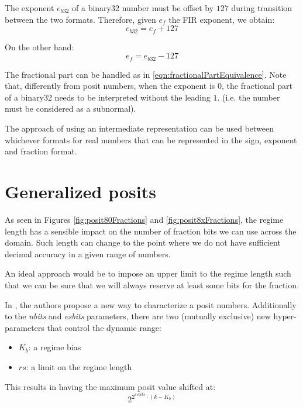 The exponent $e_{b32}$ of a binary32 number must be offset by $127$ during transition between the two formats. Therefore, given $e_f$ the FIR exponent, we obtain:
\begin{equation}
    e_{b32} = e_f + 127
\end{equation}

On the other hand:
\begin{equation}
    e_{f} = e_{b32} - 127
\end{equation}

The fractional part can be handled as in \ref{eqn:fractionalPartEquivalence}. Note that, differently from posit numbers, when the exponent is $0$, the fractional part of a binary32 needs to be interpreted without the leading $1.$ (i.e. the number must be considered as a subnormal).

The approach of using an intermediate representation can be used between whichever formats for real numbers that can be represented in the sign, exponent and fraction format.


\section{Generalized posits}

As seen in Figures \ref{fig:posit80Fractions} and \ref{fig:posit8xFractions}, the regime length has a sensible impact on the number of fraction bits we can use across the domain. Such length can change to the point where we do not have sufficient decimal accuracy in a given range of numbers. 

An ideal approach would be to impose an upper limit to the regime length such that we can be sure that we will always reserve at least some bits for the fraction.

In \cite{9151086}, the authors propose a new way to characterize a posit numbers. Additionally to the \textit{nbits}  and \textit{esbits} parameters, there are two (mutually exclusive) new hyper-parameters that control the dynamic range:
\begin{itemize}
    \item $K_b$: a regime bias 
    \item $rs$: a limit on the regime length
\end{itemize}

This results in having the maximum posit value shifted at:
\begin{equation}
    2^{2^{esbits} \cdot (k-K_b)}
\end{equation}

